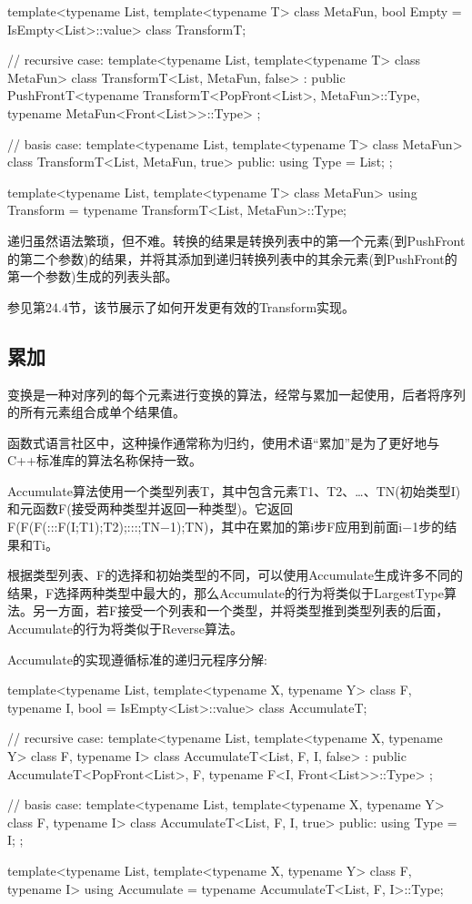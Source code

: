 \begin{cpp}
template<typename List, template<typename T> class MetaFun,
bool Empty = IsEmpty<List>::value>
class TransformT;

// recursive case:
template<typename List, template<typename T> class MetaFun>
class TransformT<List, MetaFun, false>
: public PushFrontT<typename TransformT<PopFront<List>, MetaFun>::Type,
typename MetaFun<Front<List>>::Type>
{
};

// basis case:
template<typename List, template<typename T> class MetaFun>
class TransformT<List, MetaFun, true>
{
	public:
	using Type = List;
};

template<typename List, template<typename T> class MetaFun>
using Transform = typename TransformT<List, MetaFun>::Type;
\end{cpp}

递归虽然语法繁琐，但不难。转换的结果是转换列表中的第一个元素(到PushFront的第二个参数)的结果，并将其添加到递归转换列表中的其余元素(到PushFront的第一个参数)生成的列表头部。

参见第24.4节，该节展示了如何开发更有效的Transform实现。

\subsection{累加}

变换是一种对序列的每个元素进行变换的算法，经常与累加一起使用，后者将序列的所有元素组合成单个结果值。

\begin{notice}函数式语言社区中，这种操作通常称为归约，使用术语“累加”是为了更好地与C++标准库的算法名称保持一致。
\end{notice}

Accumulate算法使用一个类型列表T，其中包含元素T1、T2、…、TN(初始类型I)和元函数F(接受两种类型并返回一种类型)。它返回F(F(F(:::F(I;T1);T2);:::;TN−1);TN)，其中在累加的第i步F应用到前面i−1步的结果和Ti。

根据类型列表、F的选择和初始类型的不同，可以使用Accumulate生成许多不同的结果，F选择两种类型中最大的，那么Accumulate的行为将类似于LargestType算法。另一方面，若F接受一个列表和一个类型，并将类型推到类型列表的后面，Accumulate的行为将类似于Reverse算法。

Accumulate的实现遵循标准的递归元程序分解:

\begin{cpp}
template<typename List,
		template<typename X, typename Y> class F,
		typename I,
		bool = IsEmpty<List>::value>
class AccumulateT;

// recursive case:
template<typename List,
		template<typename X, typename Y> class F,
		typename I>
class AccumulateT<List, F, I, false>
: public AccumulateT<PopFront<List>, F,
					typename F<I, Front<List>>::Type>
{
};

// basis case:
template<typename List,
		template<typename X, typename Y> class F,
		typename I>
class AccumulateT<List, F, I, true>
{
	public:
	using Type = I;
};

template<typename List,
		template<typename X, typename Y> class F,
		typename I>
using Accumulate = typename AccumulateT<List, F, I>::Type;
\end{cpp}

